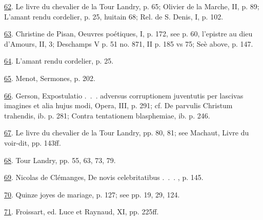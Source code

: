 \protect\hypertarget{23_NOTES.xhtmlux5cux23id_1148}{\protect\hyperlink{13_Chapter_Six__THE_DEPICTION_OF_TH.xhtmlux5cux23id_1147}{62}}.
Le livre du chevalier de la Tour Landry, p. 65; Olivier de la Marche,
II, p. 89; L'amant rendu cordelier, p. 25, huitain 68; Rel. de S. Denis,
I, p. 102.

\protect\hypertarget{23_NOTES.xhtmlux5cux23id_1146}{\protect\hyperlink{13_Chapter_Six__THE_DEPICTION_OF_TH.xhtmlux5cux23id_1145}{63}}.
Christine de Pisan, Oeuvres poétiques, I, p. 172, see p. 60, l'epistre
au dieu d'Amours, II, 3; Deschamps V p. 51 no. 871, II p. 185 vs 75; Seè
above, p. 147.

\protect\hypertarget{23_NOTES.xhtmlux5cux23id_1144}{\protect\hyperlink{13_Chapter_Six__THE_DEPICTION_OF_TH.xhtmlux5cux23id_1143}{64}}.
L'amant rendu cordelier, p. 25.

\protect\hypertarget{23_NOTES.xhtmlux5cux23id_1142}{\protect\hyperlink{13_Chapter_Six__THE_DEPICTION_OF_TH.xhtmlux5cux23id_1141}{65}}.
Menot, Sermones, p. 202.

\protect\hypertarget{23_NOTES.xhtmlux5cux23id_1140}{\protect\hyperlink{13_Chapter_Six__THE_DEPICTION_OF_TH.xhtmlux5cux23id_1139}{66}}.
Gerson, Expostulatio .~.~. adversus corruptionem juventutis per lascivas
imagines et alia hujus modi, Opera, III, p. 291; cf. De parvulis
Christum trahendis, ib. p. 281; Contra tentationem blasphemiae, ib. p.
246.

\protect\hypertarget{23_NOTES.xhtmlux5cux23id_1138}{\protect\hyperlink{13_Chapter_Six__THE_DEPICTION_OF_TH.xhtmlux5cux23id_1137}{67}}.
Le livre du chevalier de la Tour Landry, pp. 80, 81; see Machaut, Livre
du voir-dit, pp. 143ff.

\protect\hypertarget{23_NOTES.xhtmlux5cux23id_1136}{\protect\hyperlink{13_Chapter_Six__THE_DEPICTION_OF_TH.xhtmlux5cux23id_1135}{68}}.
Tour Landry, pp. 55, 63, 73, 79.

\protect\hypertarget{23_NOTES.xhtmlux5cux23id_1134}{\protect\hyperlink{13_Chapter_Six__THE_DEPICTION_OF_TH.xhtmlux5cux23id_1133}{69}}.
Nicolas de Clémanges, De novis celebritatibus .~.~. , p. 145.

\protect\hypertarget{23_NOTES.xhtmlux5cux23id_1132}{\protect\hyperlink{13_Chapter_Six__THE_DEPICTION_OF_TH.xhtmlux5cux23id_1131}{70}}.
Quinze joyes de mariage, p. 127; see pp. 19, 29, 124.

\protect\hypertarget{23_NOTES.xhtmlux5cux23id_1130}{\protect\hyperlink{13_Chapter_Six__THE_DEPICTION_OF_TH.xhtmlux5cux23id_1129}{71}}.
Froissart, ed. Luce et Raynaud, XI, pp. 225ff.

